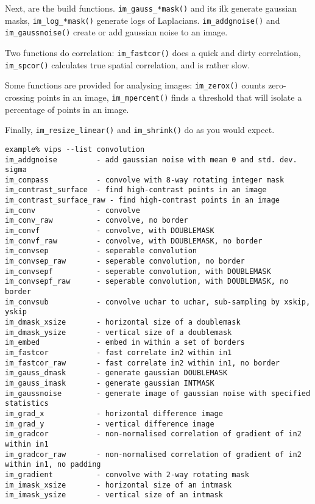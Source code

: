 Next, are the build functions. \verb+im_gauss_*mask()+ and its ilk
generate gaussian masks, \verb+im_log_*mask()+ generate logs of Laplacians.
\verb+im_addgnoise()+ and \verb+im_gaussnoise()+ create or add gaussian
noise to an image.

Two functions do correlation: \verb+im_fastcor()+ does a quick and dirty
correlation, \verb+im_spcor()+ calculates true spatial correlation, and is
rather slow.

Some functions are provided for analysing images: \verb+im_zerox()+ counts
zero-crossing points in an image, \verb+im_mpercent()+ finds a threshold
that will isolate a percentage of points in an image.

Finally, \verb+im_resize_linear()+ and \verb+im_shrink()+ do as you would
expect.

\begin{fig2}
\begin{verbatim}
example% vips --list convolution
im_addgnoise         - add gaussian noise with mean 0 and std. dev. sigma
im_compass           - convolve with 8-way rotating integer mask
im_contrast_surface  - find high-contrast points in an image
im_contrast_surface_raw - find high-contrast points in an image
im_conv              - convolve
im_conv_raw          - convolve, no border
im_convf             - convolve, with DOUBLEMASK
im_convf_raw         - convolve, with DOUBLEMASK, no border
im_convsep           - seperable convolution
im_convsep_raw       - seperable convolution, no border
im_convsepf          - seperable convolution, with DOUBLEMASK
im_convsepf_raw      - seperable convolution, with DOUBLEMASK, no border
im_convsub           - convolve uchar to uchar, sub-sampling by xskip, yskip
im_dmask_xsize       - horizontal size of a doublemask
im_dmask_ysize       - vertical size of a doublemask
im_embed             - embed in within a set of borders
im_fastcor           - fast correlate in2 within in1
im_fastcor_raw       - fast correlate in2 within in1, no border
im_gauss_dmask       - generate gaussian DOUBLEMASK
im_gauss_imask       - generate gaussian INTMASK
im_gaussnoise        - generate image of gaussian noise with specified statistics
im_grad_x            - horizontal difference image
im_grad_y            - vertical difference image
im_gradcor           - non-normalised correlation of gradient of in2 within in1
im_gradcor_raw       - non-normalised correlation of gradient of in2 within in1, no padding
im_gradient          - convolve with 2-way rotating mask
im_imask_xsize       - horizontal size of an intmask
im_imask_ysize       - vertical size of an intmask

\end{verbatim}
\end{fig2}
